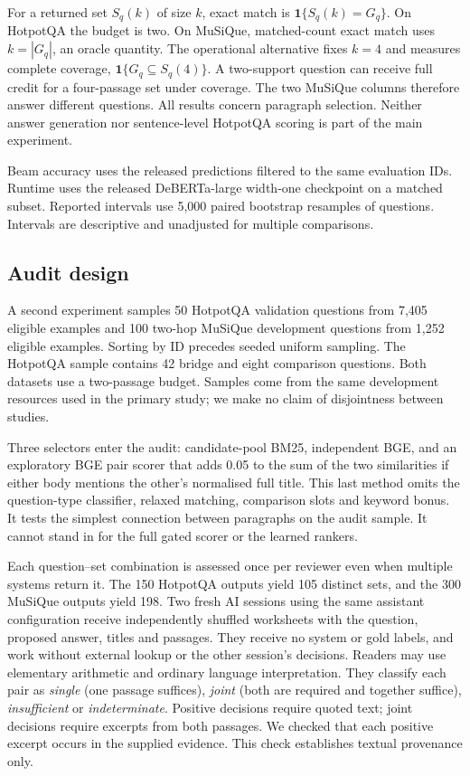 \documentclass[twoside,a4paper,11pt]{article}
\begin{document}
For a returned set $S_q(k)$ of size $k$, exact match is $\mathbf{1}\{S_q(k)=G_q\}$. On HotpotQA the budget is two. On MuSiQue, matched-count exact match uses $k=|G_q|$, an oracle quantity. The operational alternative fixes $k=4$ and measures complete coverage, $\mathbf{1}\{G_q\subseteq S_q(4)\}$. A two-support question can receive full credit for a four-passage set under coverage. The two MuSiQue columns therefore answer different questions. All results concern paragraph selection. Neither answer generation nor sentence-level HotpotQA scoring is part of the main experiment.

Beam accuracy uses the released predictions filtered to the same evaluation IDs. Runtime uses the released DeBERTa-large width-one checkpoint on a matched subset. Reported intervals use 5,000 paired bootstrap resamples of questions. Intervals are descriptive and unadjusted for multiple comparisons.

\subsection{Audit design}
A second experiment samples 50 HotpotQA validation questions from 7,405 eligible examples and 100 two-hop MuSiQue development questions from 1,252 eligible examples. Sorting by ID precedes seeded uniform sampling. The HotpotQA sample contains 42 bridge and eight comparison questions. Both datasets use a two-passage budget. Samples come from the same development resources used in the primary study; we make no claim of disjointness between studies.

Three selectors enter the audit: candidate-pool BM25, independent BGE, and an exploratory BGE pair scorer that adds 0.05 to the sum of the two similarities if either body mentions the other's normalised full title. This last method omits the question-type classifier, relaxed matching, comparison slots and keyword bonus. It tests the simplest connection between paragraphs on the audit sample. It cannot stand in for the full gated scorer or the learned rankers.

Each question--set combination is assessed once per reviewer even when multiple systems return it. The 150 HotpotQA outputs yield 105 distinct sets, and the 300 MuSiQue outputs yield 198. Two fresh AI sessions using the same assistant configuration receive independently shuffled worksheets with the question, proposed answer, titles and passages. They receive no system or gold labels, and work without external lookup or the other session's decisions. Readers may use elementary arithmetic and ordinary language interpretation. They classify each pair as \emph{single} (one passage suffices), \emph{joint} (both are required and together suffice), \emph{insufficient} or \emph{indeterminate}. Positive decisions require quoted text; joint decisions require excerpts from both passages. We checked that each positive excerpt occurs in the supplied evidence. This check establishes textual provenance only.
\end{document}
